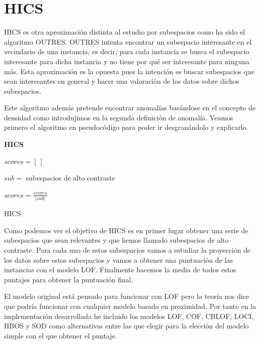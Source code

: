 \section{HICS}

HICS es otra aproximación distinta al estudio por subespacios como ha sido el algoritmo OUTRES. OUTRES intenta encontrar un subespacio interesante en el vecindario de una instancia, es decir, para cada instancia se busca el subespacio interesante para dicha instancia y no tiene por qué ser interesante para ninguna más. Esta aproximación es la opuesta pues la intención es buscar subespacios que sean interesantes en general y hacer una valoración de los datos sobre dichos subespacios.

Este algoritmo además pretende encontrar anomalías basándose en el concepto de densidad como introdujimos en la segunda definición de anomalía. Veamos primero el algoritmo en pseudocódigo para poder ir desgranándolo y explicarlo.

\begin{algorithm}[H]{\textbf{HICS}}
	
	
	$scores = [ \ ]$
	
	$sub = $ subespacios de alto contraste
	

	$scores = \frac{scores}{|sub|}$
	
	
	\caption{HICS}
	\label{hics}
\end{algorithm}

Como podemos ver el objetivo de HICS es en primer lugar obtener una serie de subespacios que sean relevantes y que hemos llamado subespacios de alto contraste. Para cada uno de estos subespacios vamos a estudiar la proyección de los datos sobre estos subespacios y vamos a obtener una puntuación de las instancias con el modelo LOF. Finalmente hacemos la media de todos estos puntajes para obtener la puntuación final. 

El modelo original está pensado para funcionar con LOF pero la teoría nos dice que podría funcionar con cualquier modelo basado en proximidad. Por tanto en la implementación desarrollada he incluido los modelos LOF, COF, CBLOF, LOCI, HBOS y SOD como alternativas entre las que elegir para la elección del modelo simple con el que obtener el puntaje.

